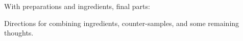 \begin{note}
  With preparations and ingredients, final parts:

  \begin{TOCEnum}
  \item

    Directions for combining ingredients, counter-samples, and some remaining thoughts.
  \end{TOCEnum}
\end{note}

